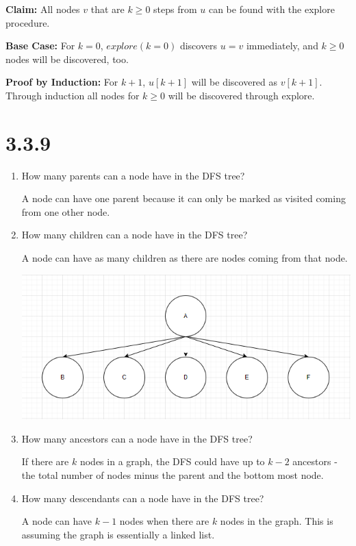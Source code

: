 \documentclass[12pt, letterpaper, twoside]{article}
\begin{document}
\textbf{Claim:} All nodes $v$ that are $k\ge0$ steps from $u$ can be found with the explore procedure.

\textbf{Base Case:} For $k=0$, $explore(k=0)$ discovers $u=v$ immediately, and $k\ge0$ nodes will be discovered, too.

\textbf{Proof by Induction:} For $k+1$, $u[k+1]$ will be discovered as $v[k+1]$. Through induction all nodes for $k\ge{0}$ will be discovered through explore.
\section*{3.3.9}
\begin{enumerate}
  \item How many parents can a node have in the DFS tree?
  
  A node can have one parent because it can only be marked as visited coming from one other node.
  
  \item How many children can a node have in the DFS tree?
  
  A node can have as many children as there are nodes coming from that node.
  
  \includegraphics[]{dfsManyChildren.png}

  \item How many ancestors can a node have in the DFS tree?
  
  If there are $k$ nodes in a graph, the DFS could have up to $k-2$ ancestors - the total number of nodes minus the parent and the bottom most node.

  \item How many descendants can a node have in the DFS tree?
  
  A node can have $k-1$ nodes when there are $k$ nodes in the graph. This is assuming the graph is essentially a linked list.

\end{enumerate}
\end{document}
